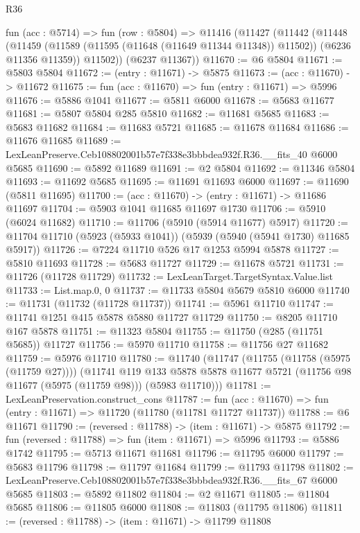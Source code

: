 \begin{lexlean}{R36}
\begin{coremodule}
  fun (acc : @5714) =>
  fun (row : @5804) =>
  @11416
    (@11427
      (@11442
        (@11448
          (@11459 (@11589 (@11595 (@11648 (@11649 @11344 @11348)) @11502)) (@6236 @11356 @11359))
          @11502))
      (@6237 @11367))
@11670 := @6 @5804
@11671 := @5803 @5804
@11672 := (entry : @11671) -> @5875
@11673 := (acc : @11670) -> @11672
@11675 := fun (acc : @11670) => fun (entry : @11671) => @5996
@11676 := @5886 @1041
@11677 := @5811 @6000
@11678 := @5683 @11677
@11681 := @5807 @5804 @285 @5810
@11682 := @11681 @5685
@11683 := @5683 @11682
@11684 := @11683 @5721
@11685 := @11678 @11684
@11686 := @11676 @11685
@11689 := LexLeanPreserve.Ceb108802001b57e7f338e3bbbdea932f.R36.__fits_40 @6000 @5685
@11690 := @5892 @11689
@11691 := @2 @5804
@11692 := @11346 @5804
@11693 := @11692 @5685
@11695 := @11691 @11693 @6000
@11697 := @11690 (@5811 @11695)
@11700 := (acc : @11670) -> (entry : @11671) -> @11686 @11697
@11704 := @5903 @1041 @11685 @11697 @1730
@11706 := @5910 (@6024 @11682)
@11710 := @11706 (@5910 (@5914 @11677) @5917)
@11720 := @11704 @11710 (@5923 (@5933 @1041)) (@5939 (@5940 (@5941 @1730) @11685 @5917))
@11726 := @7224 @11710 @526 @17 @1253 @5994 @5878
@11727 := @5810 @11693
@11728 := @5683 @11727
@11729 := @11678 @5721
@11731 := @11726 (@11728 @11729)
@11732 := LexLeanTarget.TargetSyntax.Value.list
@11733 := List.map.{0, 0}
@11737 := @11733 @5804 @5679 @5810 @6000
@11740 := @11731 (@11732 (@11728 @11737))
@11741 := @5961 @11710
@11747 := @11741 @1251 @415 @5878 @5880 @11727 @11729
@11750 := @8205 @11710 @167 @5878
@11751 := @11323 @5804
@11755 := @11750 (@285 (@11751 @5685)) @11727
@11756 := @5970 @11710
@11758 := @11756 @27 @11682
@11759 := @5976 @11710
@11780 := @11740
    (@11747
      (@11755 (@11758 (@5975 (@11759 @27))))
      (@11741
        @119
        @133
        @5878
        @5878
        @11677
        @5721
        (@11756 @98 @11677 (@5975 (@11759 @98)))
        (@5983 @11710)))
@11781 := LexLeanPreservation.construct_cons
@11787 := fun (acc : @11670) => fun (entry : @11671) => @11720 (@11780 (@11781 @11727 @11737))
@11788 := @6 @11671
@11790 := (reversed : @11788) -> (item : @11671) -> @5875
@11792 := fun (reversed : @11788) => fun (item : @11671) => @5996
@11793 := @5886 @1742
@11795 := @5713 @11671 @11681
@11796 := @11795 @6000
@11797 := @5683 @11796
@11798 := @11797 @11684
@11799 := @11793 @11798
@11802 := LexLeanPreserve.Ceb108802001b57e7f338e3bbbdea932f.R36.__fits_67 @6000 @5685
@11803 := @5892 @11802
@11804 := @2 @11671
@11805 := @11804 @5685
@11806 := @11805 @6000
@11808 := @11803 (@11795 @11806)
@11811 := (reversed : @11788) -> (item : @11671) -> @11799 @11808

\end{coremodule}
\end{lexlean}
